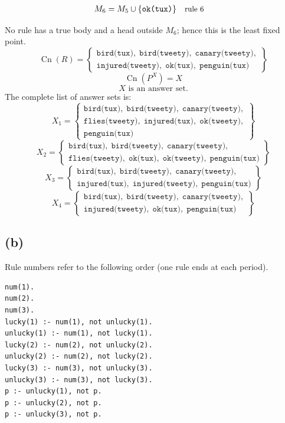 \documentclass[a4paper,11pt]{article}
\newif\ifexplain
\newcommand{\explain}[1]{\ifexplain\begin{erklbox}#1\end{erklbox}\fi}
\newcommand{\why}[1]{\text{\small #1}}
\newcommand{\teil}[1]{\subsection*{(#1)}}
\newcommand{\at}[1]{\texttt{#1}}
\begin{document}
\begin{align*}
M_{6} &= M_{5}\cup \{\at{ok(tux)}\} && \why{rule 6}
\end{align*}
\explain{Für $\at{ok(tux)}$ brauchen wir $\at{bird(tux)}$. Weil diese Voraussetzungen bereits hergeleitet sind, dürfen wir den Regelkopf jetzt aufnehmen und alle bisherigen Atome behalten; bei einer fehlenden Voraussetzung würde diese Regel dagegen noch nichts beitragen.}
No rule has a true body and a head outside $M_{6}$; hence this is the least fixed point.
\[
\operatorname{Cn}(R)=\left\{\begin{gathered}\at{bird(tux)},\;\at{bird(tweety)},\;\at{canary(tweety)},\\\at{injured(tweety)},\;\at{ok(tux)},\;\at{penguin(tux)}\end{gathered}\right\}
\]
\[
\operatorname{Cn}(P^X)=X
\]
\[
\boxed{X\text{ is an answer set.}}
\]
The complete list of answer sets is:
\[
\boxed{X_1=\left\{\begin{gathered}\at{bird(tux)},\;\at{bird(tweety)},\;\at{canary(tweety)},\\\at{flies(tweety)},\;\at{injured(tux)},\;\at{ok(tweety)},\\\at{penguin(tux)}\end{gathered}\right\}}
\]
\[
\boxed{X_2=\left\{\begin{gathered}\at{bird(tux)},\;\at{bird(tweety)},\;\at{canary(tweety)},\\\at{flies(tweety)},\;\at{ok(tux)},\;\at{ok(tweety)},\;\at{penguin(tux)}\end{gathered}\right\}}
\]
\[
\boxed{X_3=\left\{\begin{gathered}\at{bird(tux)},\;\at{bird(tweety)},\;\at{canary(tweety)},\\\at{injured(tux)},\;\at{injured(tweety)},\;\at{penguin(tux)}\end{gathered}\right\}}
\]
\[
\boxed{X_4=\left\{\begin{gathered}\at{bird(tux)},\;\at{bird(tweety)},\;\at{canary(tweety)},\\\at{injured(tweety)},\;\at{ok(tux)},\;\at{penguin(tux)}\end{gathered}\right\}}
\]
\teil{b}
Rule numbers refer to the following order (one rule ends at each period).
\begin{small}
\begin{verbatim}
num(1).
num(2).
num(3).
lucky(1) :- num(1), not unlucky(1).
unlucky(1) :- num(1), not lucky(1).
lucky(2) :- num(2), not unlucky(2).
unlucky(2) :- num(2), not lucky(2).
lucky(3) :- num(3), not unlucky(3).
unlucky(3) :- num(3), not lucky(3).
p :- unlucky(1), not p.
p :- unlucky(2), not p.
p :- unlucky(3), not p.
\end{verbatim}
\end{small}
\end{document}
